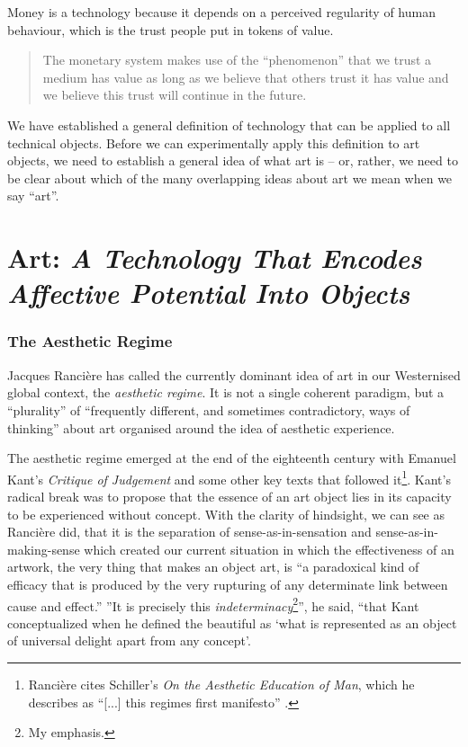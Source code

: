 \documentclass[letterpaper]{article}
\begin{document}
    Money is a technology because it depends on a perceived regularity of human behaviour, which is the trust people put in tokens of value.

    \begin{quote}
        The monetary system makes use of the “phenomenon” that we trust a medium has value as long as we believe that others trust it has value and we believe this trust will continue in the future. \citep[p.55]{theNatureOfTechnology2009}
    \end{quote}

    We have established a general definition of technology that can be applied to all technical objects. Before we can experimentally apply this definition to art objects, we need to establish a general idea of what art is – or, rather, we need to be clear about which of the many overlapping ideas about art we mean when we say “art”.

\section{Art: \emph{A Technology That Encodes Affective Potential Into Objects}}

    \subsubsection{The Aesthetic Regime}

    Jacques Rancière has called the currently dominant idea of art in our Westernised global context, the \emph{aesthetic regime}. It is not a single coherent paradigm, but a “plurality” of “frequently different, and sometimes contradictory, ways of thinking” \citep[p.8]{RanciereMdrnTms2022} about art organised around the idea of aesthetic experience.
    
    The aesthetic regime emerged at the end of the eighteenth century with Emanuel Kant's \emph{Critique of Judgement} and some other key texts that followed it\footnote{
        Rancière cites Schiller's \emph{On the Aesthetic Education of Man}, which he describes as “[...] this regimes first manifesto” \citep[pp.23–24]{RancierPltcsOfThAsthtcs2004}.
    }. Kant's radical break was to propose that the essence of an art object lies in its capacity to be experienced without concept. With the clarity of hindsight, we can see as Rancière did, that it is the separation of sense-as-in-sensation and sense-as-in-making-sense which created our current situation in which the effectiveness of an artwork, the very thing that makes an object art, is “a paradoxical kind of efficacy that is produced by the very rupturing of any determinate link between cause and effect.” \citep[p.51]{RancierThEmncptdSpcttr2009} ”It is precisely this \emph{indeterminacy}\footnote{
        My emphasis.
    }”, he said, “that Kant conceptualized when he defined the beautiful as ‘what is represented as an object of universal delight apart from any concept’. \citep[p.52]{RancierThEmncptdSpcttr2009}
\end{document}
